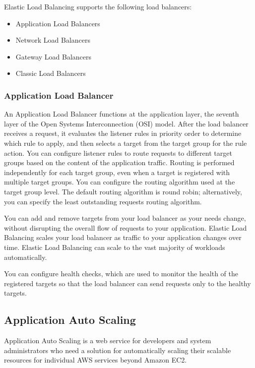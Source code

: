 		Elastic Load Balancing supports the following load balancers: 
		\begin{itemize}
			\item Application Load Balancers
			\item Network Load Balancers
			\item Gateway Load Balancers
			\item Classic Load Balancers
		\end{itemize}

		\subsubsection{Application Load Balancer}
			An Application Load Balancer \cite{elb} functions at the application layer, the seventh layer of the Open Systems Interconnection (OSI)
			model. After the load balancer receives a request, it evaluates the listener rules in priority order to determine which 
			rule to apply, and then selects a target from the target group for the rule action. 
			You can configure listener rules to route requests to different target groups based on the content of the application 
			traffic. Routing is performed independently for each target group, even when a target is registered with multiple target groups. 
			You can configure the routing algorithm used at the target group level. 
			The default routing algorithm is round robin; alternatively, you can specify the least outstanding requests routing algorithm.

			You can add and remove targets from your load balancer as your needs change, without disrupting the overall 
			flow of requests to your application. Elastic Load Balancing scales your load balancer as traffic to your application changes over time. 
			Elastic Load Balancing can scale to the vast majority of workloads automatically.

			You can configure health checks, which are used to monitor the health of the registered targets so that the 
			load balancer can send requests only to the healthy targets.

	\subsection{Application Auto Scaling}
		Application Auto Scaling \cite{autoscale} is a web service for developers and system administrators 
		who need a solution for automatically scaling their scalable resources for individual AWS services beyond Amazon EC2. 


